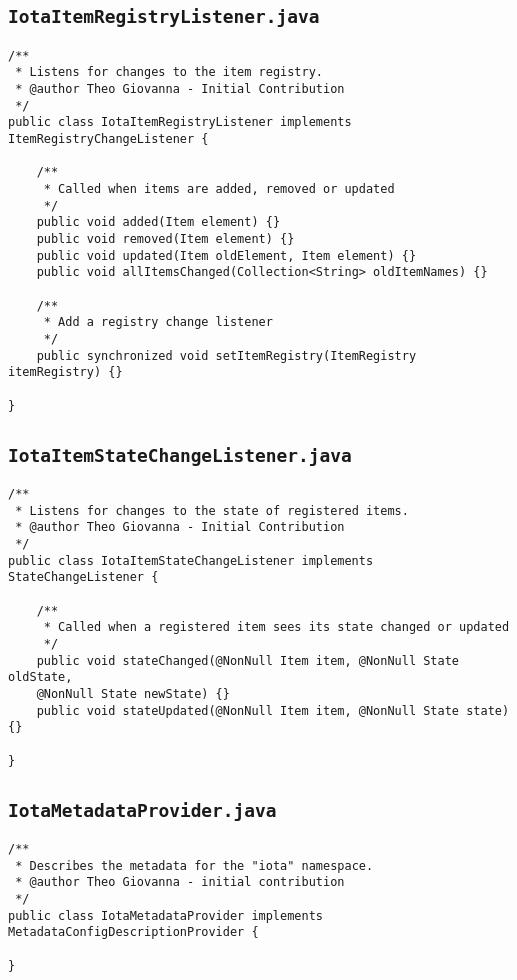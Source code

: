 \documentclass[a4paper,10pt]{article}
\begin{document}
\subsection{\texttt{IotaItemRegistryListener.java}}

\begin{verbatim}
/**
 * Listens for changes to the item registry.
 * @author Theo Giovanna - Initial Contribution
 */
public class IotaItemRegistryListener implements ItemRegistryChangeListener {

	/**
	 * Called when items are added, removed or updated
	 */ 
	public void added(Item element) {}
	public void removed(Item element) {}
	public void updated(Item oldElement, Item element) {}
	public void allItemsChanged(Collection<String> oldItemNames) {}

	/**
	 * Add a registry change listener
	 */
	public synchronized void setItemRegistry(ItemRegistry itemRegistry) {}

}
\end{verbatim}


\subsection{\texttt{IotaItemStateChangeListener.java}}

\begin{verbatim}
/**
 * Listens for changes to the state of registered items.
 * @author Theo Giovanna - Initial Contribution
 */
public class IotaItemStateChangeListener implements StateChangeListener {

	/**
	 * Called when a registered item sees its state changed or updated
	 */ 
	public void stateChanged(@NonNull Item item, @NonNull State oldState, 
	@NonNull State newState) {}
	public void stateUpdated(@NonNull Item item, @NonNull State state) {}

}
\end{verbatim}

\newpage

\subsection{\texttt{IotaMetadataProvider.java}}

\begin{verbatim}
/**
 * Describes the metadata for the "iota" namespace.
 * @author Theo Giovanna - initial contribution
 */
public class IotaMetadataProvider implements MetadataConfigDescriptionProvider {

}

\end{verbatim}
\end{document}
